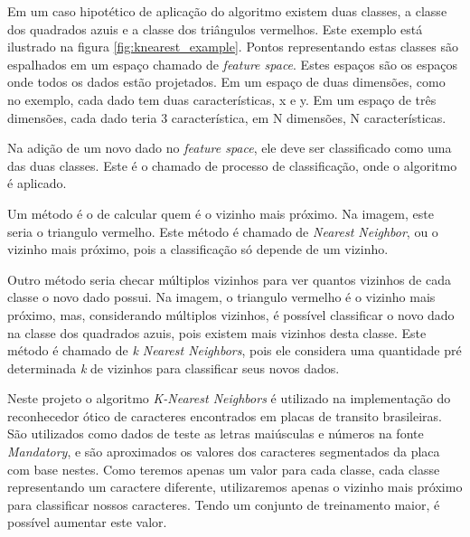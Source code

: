 Em um caso hipotético de aplicação do algoritmo existem duas classes, a classe dos quadrados azuis e a classe dos triângulos vermelhos. Este exemplo está ilustrado na figura \ref{fig:knearest_example}. Pontos representando estas classes são espalhados em um espaço chamado de \emph{feature space}. Estes espaços são os espaços onde todos os dados estão projetados. Em um espaço de duas dimensões, como no exemplo, cada dado tem duas características, x e y. Em um espaço de três dimensões, cada dado teria 3 característica, em N dimensões, N características.

Na adição de um novo dado no \emph{feature space}, ele deve ser classificado como uma das duas classes. Este é o chamado de processo de classificação, onde o algoritmo é aplicado.

Um método é o de calcular quem é o vizinho mais próximo. Na imagem, este seria o triangulo vermelho. Este método é chamado de \emph{Nearest Neighbor}, ou o vizinho mais próximo, pois a classificação só depende de um vizinho.

Outro método seria checar múltiplos vizinhos para ver quantos vizinhos de cada classe o novo dado possui. Na imagem, o triangulo vermelho é o vizinho mais próximo, mas, considerando múltiplos vizinhos, é possível classificar o novo dado na classe dos quadrados azuis, pois existem mais vizinhos desta classe. Este método é chamado de \emph{k Nearest Neighbors}, pois ele considera uma quantidade pré determinada \emph{k} de vizinhos para classificar seus novos dados. ~\cite{opencv2014knearest}

Neste projeto o algoritmo \emph{K-Nearest Neighbors} é utilizado na implementação do reconhecedor ótico de caracteres encontrados em placas de transito brasileiras. São utilizados como dados de teste as letras maiúsculas e números na fonte \emph{Mandatory}, e são aproximados os valores dos caracteres segmentados da placa com base nestes. Como teremos apenas um valor para cada classe, cada classe representando um caractere diferente, utilizaremos apenas o vizinho mais próximo para classificar nossos caracteres. Tendo um conjunto de treinamento maior, é possível aumentar este valor.
 